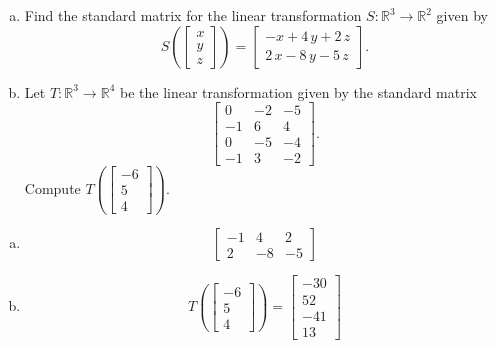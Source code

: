
\begin{exerciseStatement}

\begin{enumerate}[(a)]
\item Find the standard matrix for the linear transformation \(S:\mathbb{R}^ 3  \to \mathbb{R}^ 2 \) given by \[S\left(  \left[\begin{array}{c}
x \\
y \\
z
\end{array}\right]  \right) =  \left[\begin{array}{c}
-x + 4 \, y + 2 \, z \\
2 \, x - 8 \, y - 5 \, z
\end{array}\right] .\]
\item Let \(T:\mathbb{R}^ 3  \to \mathbb{R}^ 4 \) be the linear transformation given by the standard matrix \[ \left[\begin{array}{ccc}
0 & -2 & -5 \\
-1 & 6 & 4 \\
0 & -5 & -4 \\
-1 & 3 & -2
\end{array}\right] .\] Compute \(T\left( \left[\begin{array}{c}
-6 \\
5 \\
4
\end{array}\right]  \right)\). 
\end{enumerate}
    
\end{exerciseStatement}
    
\begin{exerciseAnswer} 

\begin{enumerate}[(a)]
\item \[ \left[\begin{array}{ccc}
-1 & 4 & 2 \\
2 & -8 & -5
\end{array}\right] \]
\item \[T\left( \left[\begin{array}{c}
-6 \\
5 \\
4
\end{array}\right]  \right)= \left[\begin{array}{c}
-30 \\
52 \\
-41 \\
13
\end{array}\right] \]
\end{enumerate}
    
\end{exerciseAnswer}
    
